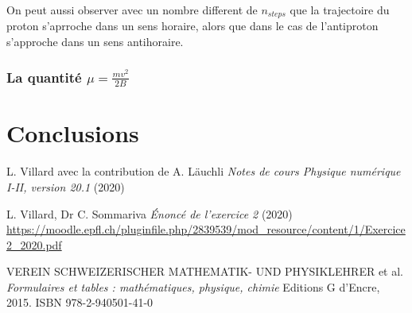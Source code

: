 \documentclass[a4paper,12pt,twoside]{article}
\begin{document}
On peut aussi observer avec un nombre different de $n_{steps}$ que la trajectoire du proton s'aprroche dans un sens horaire, alors que dans le cas de l'antiproton s'approche dans un sens antihoraire.


\subsubsection{La quantit\'e $\mu = \frac{mv^2}{2B}$}





\section{Conclusions}





\begin{thebibliography}{99}
 L. Villard avec la contribution de A. L\"auchli {\it Notes de cours Physique numérique I-II, version 20.1} (2020)
 
 L. Villard, Dr C. Sommariva {\it \'Enonc\'e de l'exercice 2} (2020)
 \url{https://moodle.epfl.ch/pluginfile.php/2839539/mod_resource/content/1/Exercice2_2020.pdf}
 
 VEREIN SCHWEIZERISCHER MATHEMATIK- UND PHYSIKLEHRER  et al. {\it Formulaires et tables : mathématiques, physique, chimie} Editions G d'Encre, 2015. ISBN 978-2-940501-41-0
 
\end{thebibliography}
\end{document}
